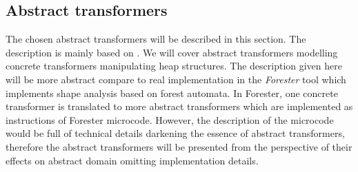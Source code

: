 \documentclass[a4paper, 12pt]{article}
\begin{document}
\subsection{Abstract transformers}
The chosen abstract transformers will be described in this section.
The description is mainly based on \cite{atva13}.
We will cover abstract transformers modelling concrete transformers
manipulating heap structures.
The description given here will be more abstract compare to real implementation
in the \emph{Forester} tool \cite{www:forester} which implements shape analysis
based on forest automata.
In Forester, one concrete transformer is translated to more abstract transformers
which are implemented as instructions of Forester microcode.
However, the description of the microcode would be full of technical details
darkening the essence of abstract transformers, therefore the abstract transformers
will be presented from the perspective of their effects on abstract domain
omitting implementation details.
\end{document}
